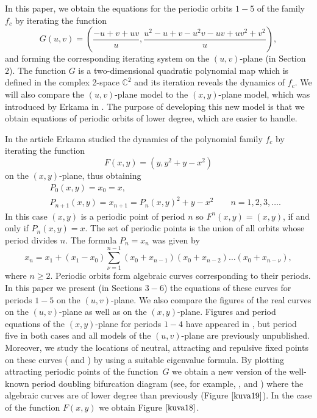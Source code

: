\documentclass[12pt,a4paper]{amsart}
\numberwithin{equation}{section}
\numberwithin{lause}{section}
\begin{document}
In this paper, we obtain the equations for the periodic orbits $1-5$ of the family $f_{c}$ by iterating the function
\begin{equation}
 G(u,v)=\left(\frac{-u+v+uv}{u},\frac{u^{2}-u+v-u^{2}v-uv+uv^{2}+v^{2}}{u}\right), \label{1}
\end{equation}
and forming the corresponding iterating system on the $(u,v)$-plane (in Section $2$). The function $G$ is a two-dimensional quadratic polynomial map which is defined in the complex 2-space $\mathbb{C}^{2}$ and its iteration reveals the dynamics of $f_{c}$. We will also compare the $(u,v)$-plane model to the $(x,y)$-plane model, which was introduced by Erkama in \cite{1}. The purpose of developing this new model is that we obtain equations of periodic orbits of lower degree, which are easier to handle.


 In the article \cite{1} Erkama studied the dynamics of the polynomial family $f_{c}$ by iterating the function
\begin{displaymath}
 F(x,y)=(y,y^{2}+y-x^{2})
 \end{displaymath}
on the $(x,y)$-plane, thus obtaining
\begin{eqnarray*}
&&P_{0}(x,y)=x_{0}=x , \\
&&P_{n+1}(x,y)=x_{n+1}=P_{n}(x,y)^{2}+y-x^{2} \qquad n=1,2,3,\ldots.
\end{eqnarray*}
 In this case $(x,y)$ is a periodic point of period $n$ so $F^{n}(x,y)=(x,y)$, if and only if $P_{n}(x,y)=x$. The set of periodic points is the union of all orbits whose period divides $n$.
The formula $P_{n}=x_{n}$ was given by
\begin{equation}
x_{n}=x_{1}+(x_{1}-x_{0})\sum_{\nu=1}^{n-1}(x_{0}+x_{n-1})(x_{0}+x_{n-2})\ldots (x_{0}+x_{n-\nu}),\label{3}
\end{equation}
where $n \geq 2$. Periodic orbits form algebraic curves corresponding to their periods. In this paper we present (in Sections $3-6$) the equations of these curves for periods $1-5$ on the $(u,v)$-plane. We also compare the figures of the real curves on the $(u,v)$-plane as well as on the $(x,y)$-plane. Figures and period equations of the $(x,y)$-plane for periods $1-4$ have appeared in \cite{1}, but period five in both cases and all models of the $(u,v)$-plane are previously unpublished. Moreover, we study the locations of neutral, attracting and repulsive fixed points on these curves (\cite{11} and \cite{16}) by using a suitable eigenvalue formula.
By plotting attracting periodic points of the function~$G$ we obtain a new version of the well-known period doubling bifurcation diagram (see, for example, \cite{6}, \cite{17} and \cite{8}) where the algebraic curves are of lower degree than previously (Figure $\ref{kuva19}$). In the case of the function $F(x,y)$ we obtain Figure $\ref{kuva18}$.
\end{document}
